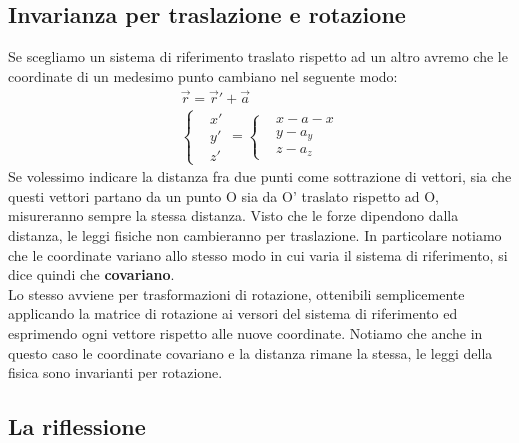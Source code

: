 \subsection{Invarianza per traslazione e rotazione}
Se scegliamo un sistema di riferimento traslato rispetto ad un altro avremo che le coordinate di un medesimo punto cambiano nel seguente modo:  
\begin{align*}
\vec{r} = \vec{r}'+ \vec{a}\\
\begin{cases}
	&x'\\
	&y'\\
	&z'
\end{cases}
=
\begin{cases}
	&x-a-x\\
	&y-a_y\\
	&z-a_z
\end{cases}
\end{align*}
Se volessimo indicare la distanza fra due punti come sottrazione di vettori, sia che questi vettori partano da un punto O sia da O' traslato rispetto ad O, misureranno sempre la stessa distanza. Visto che le forze dipendono dalla distanza, le leggi fisiche non cambieranno per traslazione. In particolare notiamo che le coordinate variano allo stesso modo in cui varia il sistema di riferimento, si dice quindi che \textbf{covariano}.\\
Lo stesso avviene per trasformazioni di rotazione, ottenibili semplicemente applicando la matrice di rotazione ai versori del sistema di riferimento ed esprimendo ogni vettore rispetto alle nuove coordinate. Notiamo che anche in questo caso le coordinate covariano e la distanza rimane la stessa, le leggi della fisica sono invarianti per rotazione. 
\subsection{La riflessione}
